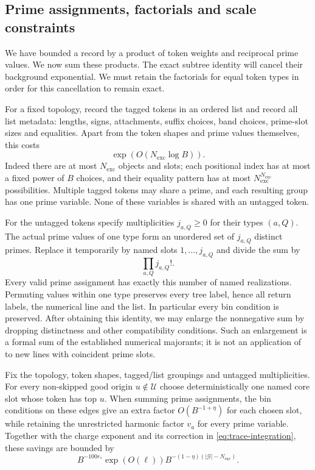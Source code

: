 \subsection{Prime assignments, factorials and scale constraints}

We have bounded a record by a product of token weights and reciprocal
prime values.  We now sum these products.  The exact subtree identity
will cancel their background exponential.  We must retain the factorials
for equal token types in order for this cancellation to remain exact.

For a fixed topology, record the tagged tokens in an ordered list and
record all list metadata: lengths, signs, attachments, suffix choices,
band choices, prime-slot sizes and equalities.  Apart from the token
shapes and prime values themselves, this costs
\begin{equation}\label{eq:trace-exceptional-entropy}
 \exp(O(N_{\mathrm{exc}}\log B)).
\end{equation}
Indeed there are at most $N_{\mathrm{exc}}$ objects and slots; each
positional index has at most a fixed power of $B$ choices, and their
equality pattern has at most
$N_{\mathrm{exc}}^{N_{\mathrm{exc}}}$ possibilities.  Multiple tagged
tokens may share a prime, and each resulting group has one prime
variable.  None of these variables is shared with an untagged token.

For the untagged tokens specify multiplicities $j_{a,Q}\ge0$ for their
types $(a,Q)$.  The actual prime values of one type form an unordered
set of $j_{a,Q}$ distinct primes.  Replace it temporarily by named
slots $1,\ldots,j_{a,Q}$ and divide the sum by
\begin{equation}\label{eq:trace-factorial}
 \prod_{a,Q}j_{a,Q}!.
\end{equation}
Every valid prime assignment has exactly this number of named
realizations.  Permuting values within one type preserves every tree
label, hence all return labels, the numerical line and the list.
In particular every bin condition is preserved.  After obtaining this
identity, we may enlarge the nonnegative sum by dropping distinctness
and other compatibility conditions.  Such an enlargement is a formal
sum of the established numerical majorants; it is not an application
of  to new lines with coincident prime slots.

\begin{lemma}\label{lem:trace-pivots}
Fix the topology, token shapes, tagged/list groupings and untagged
multiplicities.  For every non-skipped good origin $u\notin\mathcal U$
choose deterministically one named core slot whose token has top $u$.
When summing prime assignments, the bin conditions on these edges give
an extra factor $O(B^{-1+\eta})$ for each chosen slot, while retaining
the unrestricted harmonic factor $v_a$ for every prime variable.
Together with the charge exponent and its correction in
\eqref{eq:trace-integration}, these savings are bounded by
\begin{equation}\label{eq:trace-pivot-saving}
 B^{-100r_*}\exp(O(\ell))
       B^{-(1-\eta)(|\mathcal G|-N_{\mathrm{exc}})}.
\end{equation}
\end{lemma}

